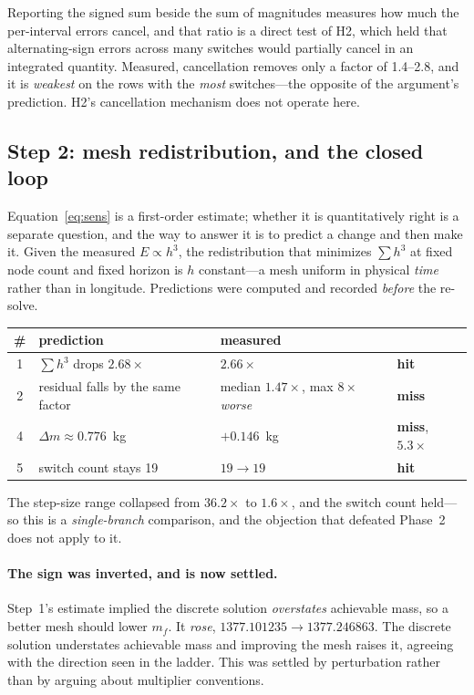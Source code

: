 \documentclass[11pt]{article}
\newcommand{\mf}{m_f}
\begin{document}
Reporting the signed sum beside the sum of magnitudes measures how much the
per-interval errors cancel, and that ratio is a direct test of H2, which held
that alternating-sign errors across many switches would partially cancel in an
integrated quantity. Measured, cancellation removes only a factor of 1.4--2.8,
and it is \emph{weakest} on the rows with the \emph{most} switches---the
opposite of the argument's prediction. H2's cancellation mechanism does not
operate here.

\subsection{Step 2: mesh redistribution, and the closed loop}

Equation~\eqref{eq:sens} is a first-order estimate; whether it is quantitatively
right is a separate question, and the way to answer it is to predict a change
and then make it. Given the measured $E \propto h^3$, the redistribution that
minimizes $\sum h^3$ at fixed node count and fixed horizon is $h$ constant---a
mesh uniform in physical \emph{time} rather than in longitude. Predictions were
computed and recorded \emph{before} the re-solve.

\begin{table}[h]
\centering\small
\begin{tabular}{clll}
\toprule
\# & prediction & measured & \\
\midrule
1 & $\sum h^3$ drops $2.68\times$ & $2.66\times$ & \textbf{hit} \\
2 & residual falls by the same factor & median $1.47\times$, max $8\times$ \emph{worse} & \textbf{miss} \\
4 & $\Delta m \approx 0.776$~kg & $+0.146$~kg & \textbf{miss}, $5.3\times$ \\
5 & switch count stays 19 & $19 \to 19$ & \textbf{hit} \\
\bottomrule
\end{tabular}
\end{table}

The step-size range collapsed from $36.2\times$ to $1.6\times$, and the switch
count held---so this is a \emph{single-branch} comparison, and the objection
that defeated Phase~2 does not apply to it.

\paragraph{The sign was inverted, and is now settled.} Step~1's estimate implied
the discrete solution \emph{overstates} achievable mass, so a better mesh should
lower $\mf$. It \emph{rose}, $1377.101235 \to 1377.246863$. The discrete
solution understates achievable mass and improving the mesh raises it, agreeing
with the direction seen in the ladder. This was settled by perturbation rather
than by arguing about multiplier conventions.
\end{document}
